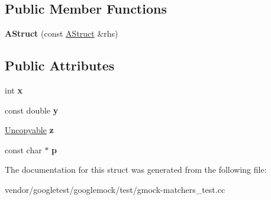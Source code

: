 \subsection*{Public Member Functions}
\begin{DoxyCompactItemize}
\item 
\mbox{\label{structtesting_1_1gmock__matchers__test_1_1_a_struct_ac5b9c0054e929e8883e13123aef50ff3}} 
{\bfseries A\+Struct} (const \hyperlink{structtesting_1_1gmock__matchers__test_1_1_a_struct}{A\+Struct} \&rhs)
\end{DoxyCompactItemize}
\subsection*{Public Attributes}
\begin{DoxyCompactItemize}
\item 
\mbox{\label{structtesting_1_1gmock__matchers__test_1_1_a_struct_a539eea02599ad34ff2bf90cc2c1adf26}} 
int {\bfseries x}
\item 
\mbox{\label{structtesting_1_1gmock__matchers__test_1_1_a_struct_a08b8592764aa4775c3d5a3542470f8bb}} 
const double {\bfseries y}
\item 
\mbox{\label{structtesting_1_1gmock__matchers__test_1_1_a_struct_a45b1006e4a7b21037610a385dcae6d8c}} 
\hyperlink{classtesting_1_1gmock__matchers__test_1_1_uncopyable}{Uncopyable} {\bfseries z}
\item 
\mbox{\label{structtesting_1_1gmock__matchers__test_1_1_a_struct_a65755db7d763d53c13483bb520f1efcd}} 
const char $\ast$ {\bfseries p}
\end{DoxyCompactItemize}


The documentation for this struct was generated from the following file\+:\begin{DoxyCompactItemize}
\item 
vendor/googletest/googlemock/test/gmock-\/matchers\+\_\+test.\+cc\end{DoxyCompactItemize}
